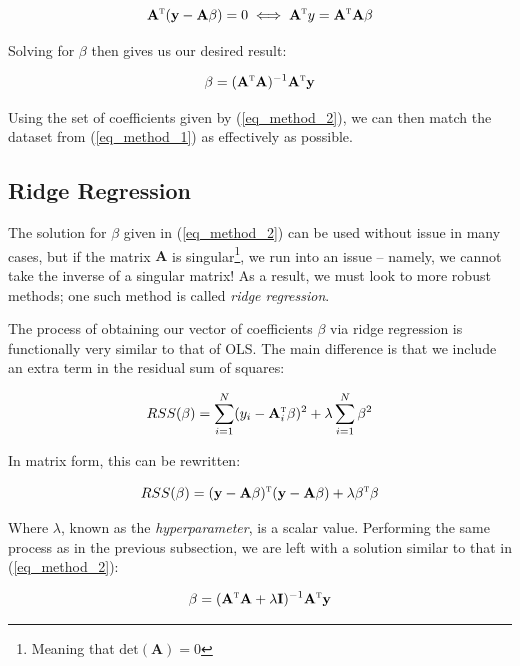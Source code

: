 \documentclass[a4paper,10pt,english]{article}
\begin{document}
\begin{multicols*}{2}
\begin{equation*}
\mathbf{A}^\textsc{t} (\mathbf{y} - \mathbf{A} \beta) = 0 \iff \mathbf{A}^\textsc{t} y = \mathbf{A}^\textsc{t} \mathbf{A} \beta
\end{equation*}

Solving for $\beta$ then gives us our desired result:

\begin{equation}
\label{eq_method_2}
\beta = (\mathbf{A}^\textsc{t} \mathbf{A} ) ^{-1} \mathbf{A}^\textsc{t} \mathbf{y}
\end{equation}

Using the set of coefficients given by (\ref{eq_method_2}), we can then match the dataset from (\ref{eq_method_1}) as effectively as possible.

\subsection*{Ridge Regression}

The solution for $\beta$ given in (\ref{eq_method_2}) can be used without issue in many cases, but if the matrix $\mathbf{A}$ is singular\footnote{Meaning that $\text{det}(\mathbf{A}) = 0$}, we run into an issue – namely, we cannot take the inverse of a singular matrix!  As a result, we must look to more robust methods; one such method is called \textit{ridge regression}.  

The process of obtaining our vector of coefficients $\beta$ via ridge regression is functionally very similar to that of OLS.  The main difference is that we include an extra term in the residual sum of squares:

\begin{equation*}
RSS(\beta) = \sum_{i=1}^N (y_i - \mathbf{A}_i^\textsc{t} \beta)^2 + \lambda \sum_{i=1}^N \beta^2
\end{equation*}

In matrix form, this can be rewritten:	

\begin{equation*}
RSS(\beta) = (\mathbf{y} - \mathbf{A} \beta)^\textsc{t}(\mathbf{y} - \mathbf{A} \beta) + \lambda \beta^\textsc{t} \beta
\end{equation*}

Where $\lambda$, known as the \textit{hyperparameter}, is a scalar value. Performing the same process as in the previous subsection, we are left with a solution similar to that in (\ref{eq_method_2}):

\begin{equation*}
\beta = (\mathbf{A}^\textsc{t} \mathbf{A} + \lambda \mathbf{I}) ^{-1} \mathbf{A}^\textsc{t} \mathbf{y}
\end{equation*}


\end{multicols*}
\end{document}
